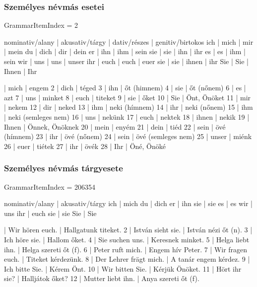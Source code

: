 \documentclass{article}
\newenvironment{desc}{\verbatim}{\endverbatim}
\newenvironment{exmp}{\verbatim}{\endverbatim}
\begin{document}
\subsubsection{Személyes névmás esetei}

GrammarItemIndex = 2

\begin{desc}
nominativ/alany | akusativ/tárgy | dativ/részes | genitiv/birtokos
ich             | mich           | mir          | mein
du              | dich           | dir          | dein 
er              | ihn            | ihm          | sein
sie             | sie            | ihn          | ihr
es              | es             | ihm          | sein
wir             | uns            | uns          | unser
ihr             | euch           | euch         | euer
sie             | sie            | ihnen        | ihr
Sie             | Sie            | Ihnen        | Ihr 
\end{desc}

\begin{exmp}
1 | mich | engem
2 | dich | téged
3 | ihn | őt (himnem)
4 | sie | őt (nőnem)
6 | es | azt
7 | uns | minket
8 | euch | titeket
9 | sie | őket
10 | Sie | Önt, Önöket
11 | mir | nekem
12 | dir | neked
13 | ihm | neki (hímnem)
14 | ihr | neki (nőnem)
15 | ihm | neki (semleges nem)
16 | uns | nekünk
17 | euch | nektek
18 | ihnen | nekik
19 | Ihnen | Önnek, Önöknek
20 | mein | enyém
21 | dein | tiéd
22 | sein | övé (hímnem)
23 | ihr | övé (nőnem)
24 | sein | övé (semleges nem)
25 | unser | miénk
26 | euer | tiétek
27 | ihr | övék
28 | Ihr | Öné, Önöké
\end{exmp}

\subsubsection{Személyes névmás tárgyesete}

GrammarItemIndex = 206354

\begin{desc}
nominativ/alany | akusativ/tárgy
ich             | mich
du              | dich
er              | ihn
sie             | sie
es              | es
wir             | uns
ihr             | euch
sie             | sie
Sie             | Sie
\end{desc}

\begin{exmp}
1 | Wir hören euch. | Hallgatunk titeket.
2 | István sieht sie. | István nézi őt (n).
3 | Ich höre sie. | Hallom őket.
4 | Sie suchen uns. | Keresnek minket.
5 | Helga liebt ihn. | Helga szereti őt (f).
6 | Peter ruft mich. | Engem hív Peter.
7 | Wir fragen euch. | Titeket kérdezünk.
8 | Der Lehrer frägt mich. | A tanár engem kérdez.
9 | Ich bitte Sie. | Kérem Önt.
10 | Wir bitten Sie. | Kérjük Önöket.
11 | Hört ihr sie? | Halljátok őket?
12 | Mutter liebt ihn. | Anya szereti őt (f).
\end{exmp}
\end{document}
